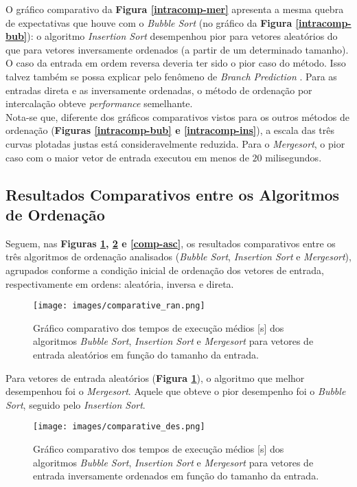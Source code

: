 \documentclass[fontsize=10pt]{article}
\begin{document}
O gráfico comparativo da \textbf{Figura \ref{intracomp-mer}} apresenta a mesma quebra de expectativas que houve com o \textit{Bubble Sort} (no gráfico da \textbf{Figura \ref{intracomp-bub}}): o algoritmo \textit{Insertion Sort} desempenhou pior para vetores aleatórios do que para vetores inversamente ordenados (a partir de um determinado tamanho). O caso da entrada em ordem reversa deveria ter sido o pior caso do método. Isso talvez também se possa explicar pelo fenômeno de \textit{Branch Prediction} \cite{ccc}. Para as entradas direta e as inversamente ordenadas, o método de ordenação por intercalação obteve \textit{performance} semelhante.\\

Nota-se que, diferente dos gráficos comparativos vistos para os outros métodos de ordenação (\textbf{Figuras \ref{intracomp-bub} e \ref{intracomp-ins}}), a escala das três curvas plotadas justas está consideravelmente reduzida. Para o \textit{Mergesort}, o pior caso com o maior vetor de entrada executou em menos de $20$ milisegundos.

\subsection{Resultados Comparativos entre os Algoritmos de Ordenação}

Seguem, nas \textbf{Figuras \ref{comp-ran}, \ref{comp-des} e \ref{comp-asc}}, os resultados comparativos entre os três algoritmos de ordenação analisados (\textit{Bubble Sort}, \textit{Insertion Sort} e \textit{Mergesort}), agrupados conforme a condição inicial de ordenação dos vetores de entrada, respectivamente em ordens: aleatória, inversa e direta.

\begin{figure}[H]
\centering
\texttt{[image: images/comparative\_ran.png]}
\caption{Gráfico comparativo dos tempos de execução médios [s] dos algoritmos \textit{Bubble Sort}, \textit{Insertion Sort} e \textit{Mergesort} para vetores de entrada aleatórios em função do tamanho da entrada.}
\label{comp-ran}
\end{figure}

Para vetores de entrada aleatórios (\textbf{Figura \ref{comp-ran}}), o algoritmo que melhor desempenhou foi o \textit{Mergesort}. Aquele que obteve o pior desempenho foi o \textit{Bubble Sort}, seguido pelo \textit{Insertion Sort}.

\begin{figure}[H]
\centering
\texttt{[image: images/comparative\_des.png]}
\caption{Gráfico comparativo dos tempos de execução médios [s] dos algoritmos \textit{Bubble Sort}, \textit{Insertion Sort} e \textit{Mergesort} para vetores de entrada inversamente ordenados em função do tamanho da entrada.}
\label{comp-des}
\end{figure}
\end{document}
